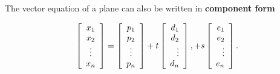 \documentclass{ximera}
\begin{document}
The vector equation of a plane can also be written in
\textbf{component form}

\begin{equation*}
  \startmat{c} x_1 \\ x_2 \\ \vdots \\ x_n \stopmat
  = \startmat{c} p_1 \\ p_2 \\ \vdots \\ p_n \stopmat
  + t \startmat{r} d_1 \\ d_2 \\ \vdots \\ d_n \stopmat,
  + s \startmat{r} e_1 \\ e_2 \\ \vdots \\ e_n \stopmat.
\end{equation*}
\end{document}
